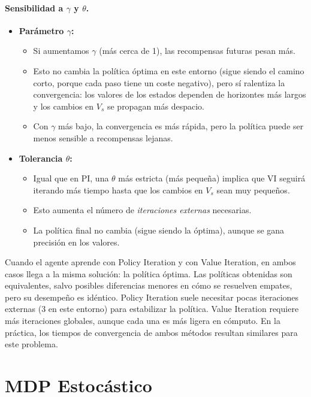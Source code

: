 \documentclass[a4paper,12pt]{article}
\begin{document}
\paragraph{Sensibilidad a $\gamma$ y $\theta$.}
\begin{itemize}
    \item \textbf{Parámetro $\gamma$:}
    \begin{itemize}
        \item Si aumentamos $\gamma$ (más cerca de 1), las recompensas futuras pesan más.
        \item Esto no cambia la política óptima en este entorno (sigue siendo el camino corto, porque cada paso tiene un coste negativo), pero sí ralentiza la 
        convergencia: los valores de los estados dependen de horizontes más largos y los cambios en $V_s$ se propagan más despacio.
        \item Con $\gamma$ más bajo, la convergencia es más rápida, pero la política puede ser menos sensible a recompensas lejanas.
    \end{itemize}
    \item \textbf{Tolerancia $\theta$:}
    \begin{itemize}
        \item Igual que en PI, una $\theta$ más estricta (más pequeña) implica que VI seguirá iterando más tiempo hasta que los cambios en $V_s$ sean muy pequeños.
        \item Esto aumenta el número de \emph{iteraciones externas} necesarias.
        \item La política final no cambia (sigue siendo la óptima), aunque se gana precisión en los valores.
    \end{itemize}
\end{itemize}

Cuando el agente aprende con Policy Iteration y con Value Iteration, en ambos casos llega a la misma solución: la política óptima.
Las políticas obtenidas son equivalentes, salvo posibles diferencias menores en cómo se resuelven empates, pero su desempeño es idéntico.
Policy Iteration suele necesitar pocas iteraciones externas (3 en este entorno) para estabilizar la política.
Value Iteration requiere más iteraciones globales, aunque cada una es más ligera en cómputo.
En la práctica, los tiempos de convergencia de ambos métodos resultan similares para este problema.

\section{MDP Estocástico}
\end{document}
